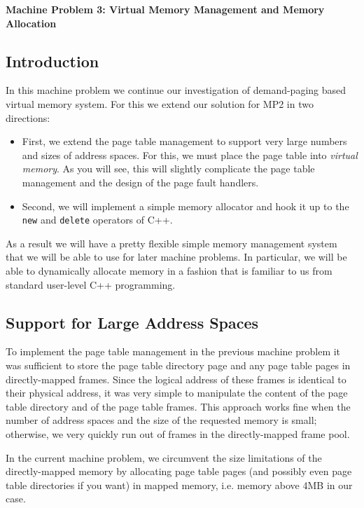 \documentclass[letterpaper,11pt]{article}
\begin{document}
\begin{center}
{\large {\bf Machine Problem 3: Virtual Memory Management and Memory Allocation}\\[0.3in]}
\end{center}

\subsection*{Introduction}

In this machine problem we continue our investigation of demand-paging 
based virtual memory system. For this we extend our solution for MP2 in two directions: 
\begin{itemize}
\item First, we extend the page table management to support very large numbers and sizes of
  address spaces. For this, we must place the page table into {\em
    virtual memory}. As you will see, this will slightly complicate
  the page table management and the design of the page fault
  handlers. 
\item Second, we will implement a simple memory allocator and hook it
  up to the {\tt new} and {\tt delete} operators of C++.
\end{itemize}
As a result we will have a pretty flexible simple memory management system
that we will be able to use for later machine problems. In particular,
we will be able to dynamically allocate memory in a fashion that is
familiar to us from standard user-level C++ programming.

\subsection*{Support for Large Address Spaces}

To implement the page table management in the previous machine problem
it was sufficient to store the page table directory page and any page
table pages in directly-mapped frames. Since the logical address of
these frames is identical to their physical address, it was very
simple to manipulate the content of the page table directory and of
the page table frames. This approach works fine when the number of
address spaces and the size of the requested memory is small;
otherwise, we very quickly run out of frames in the directly-mapped
frame pool.

In the current machine problem, we circumvent the size limitations of
the directly-mapped memory by allocating page table pages (and
possibly even page table directories if you want) in mapped memory,
i.e. memory above 4MB in our case.
\end{document}
